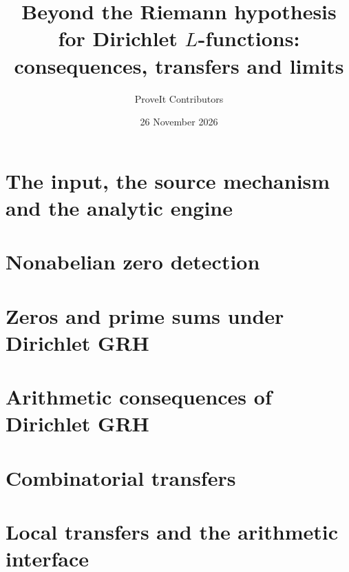 \documentclass[11pt]{article}
\title{Beyond the Riemann hypothesis for Dirichlet $L$-functions:\\
consequences, transfers and limits}
\author{ProveIt Contributors}
\date{26 November 2026}
\begin{document}
\maketitle



\setcounter{tocdepth}{1}
\tableofcontents



\part{The input, the source mechanism and the analytic engine}






\part{Nonabelian zero detection}




\part{Zeros and prime sums under Dirichlet GRH}









\part{Arithmetic consequences of Dirichlet GRH}






\part{Combinatorial transfers}






\part{Local transfers and the arithmetic interface}







\end{document}
